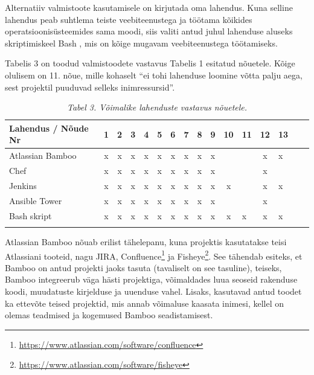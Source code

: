 \documentclass[12pt]{article}
\begin{document}
  Alternatiiv valmistoote kasutamisele on kirjutada oma lahendus. Kuna selline lahendus peab suhtlema teiste veebiteenustega ja töötama kõikides operatsioonisüsteemides sama moodi, siis valiti antud juhul lahenduse aluseks skriptimiskeel Bash \cite{bash,bash-book}, mis on kõige mugavam veebiteenustega töötamiseks.
  
  Tabelis 3 on toodud valmistoodete vastavus Tabelis 1 esitatud nõuetele. Kõige olulisem on 11. nõue, mille kohaselt ``ei tohi lahenduse loomine võtta palju aega, sest projektil puuduvad selleks inimressursid''.
  
  \begin{table}[H]
    \caption*{\textit{Tabel 3. Võimalike lahenduste vastavus nõuetele.}}
    
    \begin{tabular}{ |l|c|c|c|c|c|c|c|c|c|c V{4} c V{4} c|c| }
      \hline
      \textbf{Lahendus / Nõude Nr} & \textbf{1} & \textbf{2} & \textbf{3} & \textbf{4} & \textbf{5} & \textbf{6} & \textbf{7} & \textbf{8} & \textbf{9} & \textbf{10} & \textbf{11} & \textbf{12} & \textbf{13}\\
      \hline
      Atlassian Bamboo & x & x & x & x & x & x & x & x & x & & & x & x\\
      \hline
      Chef & x & x & x & x & x & x & x & x & x & & & x &\\
      \hline
      Jenkins & x & x & x & x & x & x & x & x & x & x & & x & x\\
      \hline
      Ansible Tower & x & x & x & x & x & x & x & x & x & & & x & \\
      \hline
      Bash skript & x & x & x & x & x & x & x & x & x & x & x & x & x\\
      \hline
    \end{tabular}
  \end{table}

  Atlassian Bamboo nõuab erilist tähelepanu, kuna projektis kasutatakse teisi Atlassiani tooteid, nagu JIRA, Confluence\footnote{\url{https://www.atlassian.com/software/confluence}} ja Fisheye\footnote{\url{https://www.atlassian.com/software/fisheye}}. See tähendab esiteks, et Bamboo on antud projekti jaoks tasuta (tavaliselt on see tasuline), teiseks, Bamboo integreerub väga hästi projektiga, võimaldades luua seoseid rakenduse koodi, muudatuste kirjelduse ja uuenduse vahel. Lisaks, kasutavad antud toodet ka ettevõte teised projektid, mis annab võimaluse kaasata inimesi, kellel on olemas teadmised ja kogemused Bamboo seadistamisest.
  
\end{document}
